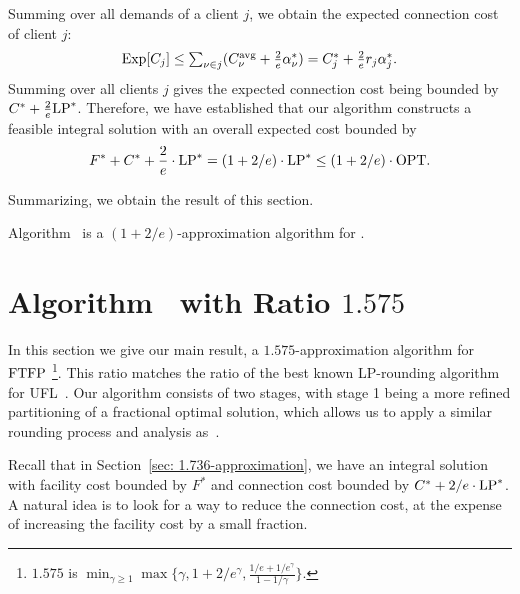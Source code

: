 \documentclass[11pt]{article}
\begin{document}
Summing over all demands of a client $j$, we obtain the
expected connection cost of client $j$:
%
\begin{equation*}
  \mbox{\rm Exp}[C_j] \leq {\textstyle\sum_{\nu\in j} (C^{{\mbox{\scriptsize\rm avg}}}_{\nu} + \frac{2}{e}\alpha_{\nu}^\ast) }
  = \textstyle{ C_j^\ast + \frac{2}{e}r_j\alpha_j^\ast}.
\end{equation*}
%
Summing over all clients $j$ gives the expected connection
cost being bounded by $C^\ast +
\frac{2}{e}\mbox{\rm LP}^\ast$. Therefore, we have established that
our algorithm constructs a feasible integral solution with
an overall expected cost bounded by
%
\begin{equation*}
  \label{eq:chudakall}
  	F^\ast + C^\ast + \frac{2}{e}\cdot \mbox{\rm LP}^\ast = (1+2/e)\cdot \mbox{\rm LP}^\ast
  \leq (1+2/e)\cdot \mbox{\rm OPT}.
\end{equation*}

Summarizing, we obtain the result of this section.

\begin{theorem}\label{thm:1736}
  Algorithm~{\ECHU} is a $(1+2/e)$-approximation algorithm for \FTFP.
\end{theorem}


\section{Algorithm~{\EBGS} with Ratio $1.575$}\label{sec: 1.575-approximation}

In this section we give our main result, a $1.575$-approximation algorithm
for $\mbox{\rm FTFP}$
%
\footnote{$1.575$ is $\min_{\gamma\geq 1}\max\{\gamma,
  1+2/e^\gamma, \frac{1/e+1/e^\gamma}{1-1/\gamma}\}$.}. 
%
This ratio matches the ratio of the best known LP-rounding
algorithm for UFL~\cite{ByrkaGS10}. Our {\EBGS} algorithm
consists of two stages, with stage 1 being a more refined
partitioning of a fractional optimal solution, which allows
us to apply a similar rounding process and analysis
as~\cite{ByrkaGS10}.

Recall that in Section~\ref{sec: 1.736-approximation}, we
have an integral solution with facility cost bounded by
$F^\ast$ and connection cost bounded by $C^\ast +
2/e\cdot\mbox{\rm LP}^\ast$. A natural idea is to look for a way to
reduce the connection cost, at the expense of increasing the
facility cost by a small fraction.
\end{document}
